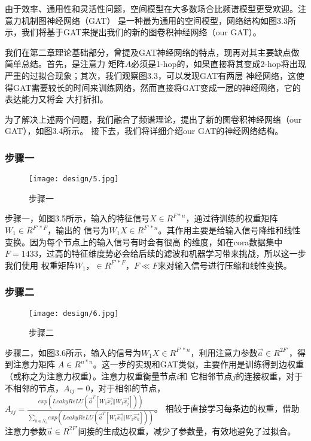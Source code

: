 由于效率、通用性和灵活性问题，空间模型在大多数场合比频谱模型更受欢迎。注意力机制图神经网络（GAT）
是一种最为通用的空间模型，网络结构如图3.3所示，我们将基于GAT来提出我们的新的图卷积神经网络（our GAT）。

我们在第二章理论基础部分，曾提及GAT神经网络的特点，现再对其主要缺点做简单总结。首先，是注意力
矩阵$A$必须是1-hop的，如果直接将其变成2-hop将出现严重的过拟合现象；其次，我们观察图3.3，可以发现GAT有两层
神经网络，这使得GAT需要较长的时间来训练网络，然而直接将GAT变成一层的神经网络，它的表达能力又将会
大打折扣。

为了解决上述两个问题，我们融合了频谱理论，提出了新的图卷积神经网络（our GAT），如图3.4所示。
接下去，我们将详细介绍our GAT的神经网络结构。

\subsubsection{步骤一}
\begin{figure}[ht]
    \centering
    \texttt{[image: design/5.jpg]}
    \caption{\label{3-5}步骤一}
\end{figure}

步骤一，如图3.5所示，输入的特征信号$ X \in R^{F*n} $，通过待训练的权重矩阵$ W_1 \in R^{F'*F} $，输出的
信号为$ W_{1}X \in R^{F'*n} $。其作用主要是给输入信号降维和线性变换。因为每个节点上的输入信号有时会有很高
的维度，如在cora数据集中$ F = 1433 $，过高的特征维度势必会给后续的滤波和机器学习带来挑战，所以这一步我们使用
权重矩阵$ W_1，\in R^{F'*F}，F \ll F $来对输入信号进行压缩和线性变换。

\subsubsection{步骤二}
\begin{figure}[ht]
    \centering
    \texttt{[image: design/6.jpg]}
    \caption{\label{3-6}步骤二}
\end{figure}

步骤二，如图3.6所示，输入的信号为$ W_{1}X \in R^{F'*n} $，利用注意力参数$ \vec{a} \in R^{2F'} $，得到注意力矩阵
$A \in R^{n*n}$。这一步的实现和GAT类似，主要作用是训练得到边权重（或称之为注意力权重）。注意力权重衡量节点$i$和
它相邻节点$j$的连接权重，对于不相邻的节点，$A_{ij} = 0$，对于相邻的节点，$ A_{ij} = \frac{exp(LeakyReLU(\vec{a}^{T}[W_{1}\vec{x_{i}}||W_{1}\vec{x_{j}}]))} { {\textstyle \sum_{k\in N_{i} }^{}} exp(LeakyReLU(\vec{a}^{T}[W_{1}\vec{x_{i}}||W_{1}\vec{x_{k}}]))} $。
相较于直接学习每条边的权重，借助注意力参数$ \vec{a} \in R^{2F'} $间接的生成边权重，减少了参数量，有效地避免了过拟合。

